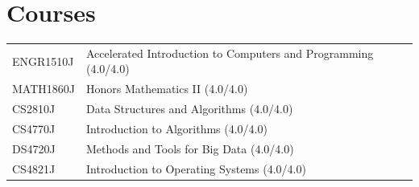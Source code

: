 
\section{Courses}
\begin{tabularx}{\linewidth}{@{}l X@{}}	
ENGR1510J & Accelerated Introduction to Computers and Programming \hfill \normalsize (4.0/4.0)\\
MATH1860J & Honors Mathematics II \hfill \normalsize (4.0/4.0)\\
CS2810J & Data Structures and Algorithms  \hfill \normalsize (4.0/4.0)\\
CS4770J & Introduction to Algorithms \hfill \normalsize (4.0/4.0)\\
DS4720J & Methods and Tools for Big Data \hfill \normalsize (4.0/4.0)\\
CS4821J & Introduction to Operating Systems \hfill \normalsize (4.0/4.0)
\end{tabularx}
